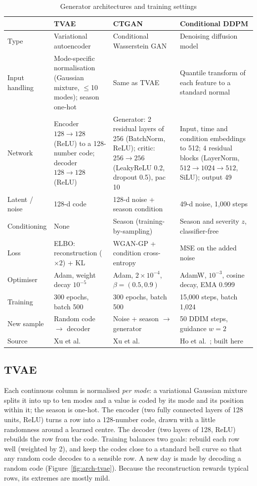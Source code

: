 \documentclass[12pt,a4paper]{report}
\begin{document}
\begin{table}[H]
\centering
\caption{Generator architectures and training settings}
\label{tab:arch}
\footnotesize
\begin{tabularx}{\textwidth}{|l|X|X|X|}
\hline
 & \textbf{TVAE} & \textbf{CTGAN} & \textbf{Conditional DDPM}\\ \hline
Type & Variational autoencoder & Conditional Wasserstein GAN & Denoising diffusion model\\ \hline
Input handling & Mode-specific normalisation (Gaussian mixture, $\le$10 modes); season one-hot & Same as TVAE & Quantile transform of each feature to a standard normal\\ \hline
Network & Encoder $128\!\to\!128$ (ReLU) to a 128-number code; decoder $128\!\to\!128$ (ReLU) & Generator: 2 residual layers of 256 (BatchNorm, ReLU); critic: $256\!\to\!256$ (LeakyReLU 0.2, dropout 0.5), pac 10 & Input, time and condition embeddings to 512; 4 residual blocks (LayerNorm, $512\!\to\!1024\!\to\!512$, SiLU); output 49\\ \hline
Latent / noise & 128-d code & 128-d noise + season condition & 49-d noise, 1{,}000 steps\\ \hline
Conditioning & None & Season (training-by-sampling) & Season and severity $z$, classifier-free\\ \hline
Loss & ELBO: reconstruction ($\times2$) + KL & WGAN-GP + condition cross-entropy & MSE on the added noise\\ \hline
Optimiser & Adam, weight decay $10^{-5}$ & Adam, $2\!\times\!10^{-4}$, $\beta=(0.5,0.9)$ & AdamW, $10^{-3}$, cosine decay, EMA 0.999\\ \hline
Training & 300 epochs, batch 500 & 300 epochs, batch 500 & 15{,}000 steps, batch 1{,}024\\ \hline
New sample & Random code $\to$ decoder & Noise + season $\to$ generator & 50 DDIM steps, guidance $w=2$\\ \hline
Source & Xu et al.~\cite{xu2019ctgan} & Xu et al.~\cite{xu2019ctgan} & Ho et al.~\cite{ho2020ddpm}; built here\\ \hline
\end{tabularx}
\end{table}

\subsection{TVAE}
Each continuous column is normalised \emph{per mode}: a variational Gaussian mixture splits it into up to ten modes and
a value is coded by its mode and its position within it; the season is one-hot. The encoder (two fully connected layers
of 128 units, ReLU) turns a row into a 128-number code, drawn with a little randomness around a learned centre. The
decoder (two layers of 128, ReLU) rebuilds the row from the code. Training balances two goals: rebuild each row well
(weighted by 2), and keep the codes close to a standard bell curve so that any random code decodes to a sensible row.
A new day is made by decoding a random code
(Figure~\ref{fig:arch-tvae}). Because the reconstruction rewards typical rows, its extremes are mostly mild.
\end{document}
